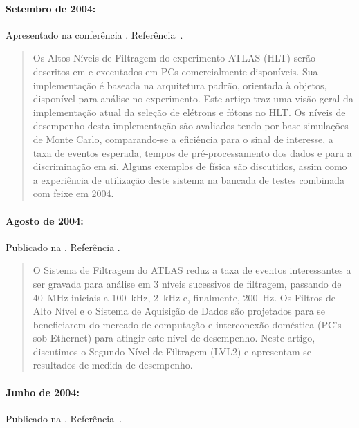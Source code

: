 \paragraph{Setembro de 2004: } Apresentado na conferência . Referência~\cite{aa:chep-04-01}.

\begin{quotation}
Os Altos Níveis de Filtragem do experimento ATLAS (HLT) serão descritos em
 e executados em PCs comercialmente disponíveis. Sua
implementação é baseada na arquitetura padrão, orientada à objetos, disponível
para análise  no experimento. Este artigo traz uma visão geral da
implementação atual da seleção de elétrons e fótons no HLT. Os níveis de
desempenho desta implementação são avaliados tendo por base simulações de
Monte Carlo, comparando-se a eficiência para o sinal de interesse, a taxa de
eventos esperada, tempos de pré-processamento dos dados e para a discriminação
em si. Alguns exemplos de física são discutidos, assim como a experiência de
utilização deste sistema na bancada de testes combinada com feixe em 2004.
\end{quotation}

\paragraph{Agosto de 2004: } Publicado na . Referência \cite{aa:tns-2004}.

\begin{quotation}
O Sistema de Filtragem do ATLAS reduz a taxa de eventos interessantes a ser
gravada para análise  em 3 níveis sucessivos de filtragem,
passando de 40~MHz iniciais a 100~kHz, 2~kHz e, finalmente, 200~Hz. Os Filtros
de Alto Nível e o Sistema de Aquisição de Dados são projetados para se
beneficiarem do mercado de computação e interconexão doméstica (PC's sob
Ethernet) para atingir este nível de desempenho. Neste artigo, discutimos o
Segundo Nível de Filtragem (LVL2) e apresentam-se resultados de medida de
desempenho.
\end{quotation}

\paragraph{Junho de 2004: } Publicado na . Referência~\cite{aa:tns-04-05}.

